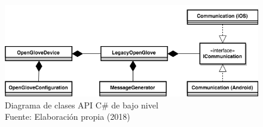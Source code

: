 \begin{figure}[H]
  \begin{center} 
   	\includegraphics[width=1.0\textwidth]{images/chapter04/OpenGlove-Architecture-API-CSharp-LowLevel.png} 
    \caption[Diagrama de clases API C\# de bajo nivel]{Diagrama de clases API C\# de bajo nivel \\Fuente: Elaboración propia (2018)}
    \label{fig:api-csharp-ll}
  \end{center}
\end{figure}




